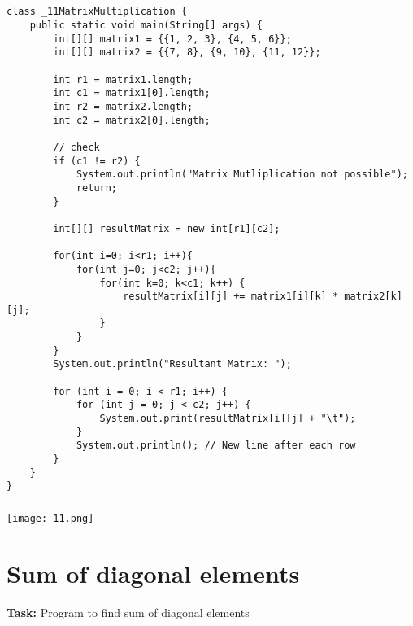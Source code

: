 \documentclass[12pt,a4paper]{article}
\begin{document}
\subsection{}
\begin{lstlisting}
class _11MatrixMultiplication {
    public static void main(String[] args) {
        int[][] matrix1 = {{1, 2, 3}, {4, 5, 6}};
        int[][] matrix2 = {{7, 8}, {9, 10}, {11, 12}};
    
        int r1 = matrix1.length;
        int c1 = matrix1[0].length;
        int r2 = matrix2.length;
        int c2 = matrix2[0].length;
    
        // check
        if (c1 != r2) {
            System.out.println("Matrix Mutliplication not possible");
            return;
        }
    
        int[][] resultMatrix = new int[r1][c2];
    
        for(int i=0; i<r1; i++){
            for(int j=0; j<c2; j++){
                for(int k=0; k<c1; k++) {
                    resultMatrix[i][j] += matrix1[i][k] * matrix2[k][j];
                }
            }
        }
        System.out.println("Resultant Matrix: ");
    
        for (int i = 0; i < r1; i++) {
            for (int j = 0; j < c2; j++) {
                System.out.print(resultMatrix[i][j] + "\t");
            }
            System.out.println(); // New line after each row
        }
    }
}
\end{lstlisting}

\subsubsection{}
\begin{center}
    \texttt{[image: 11.png]}
\end{center}


\section{Sum of diagonal elements}
\textbf{Task:} Program to find sum of diagonal elements
\end{document}
